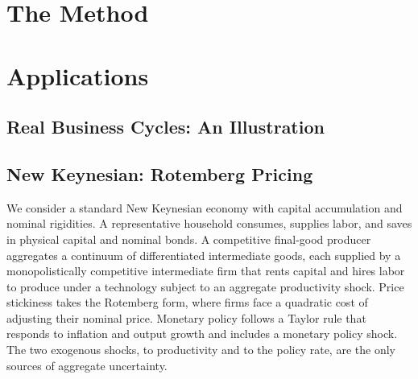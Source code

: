 \documentclass[12pt]{article}
\begin{document}
\section{The Method}\label{sec:method}


\section{Applications}\label{sec:applications}


\subsection{Real Business Cycles: An Illustration}\label{sec:app-rbc}


\subsection{New Keynesian: Rotemberg Pricing}\label{sec:app-rotemberg}

We consider a standard New Keynesian economy with capital accumulation and nominal rigidities. A representative household consumes, supplies labor, and saves in physical capital and nominal bonds. A competitive final-good producer aggregates a continuum of differentiated intermediate goods, each supplied by a monopolistically competitive intermediate firm that rents capital and hires labor to produce under a technology subject to an aggregate productivity shock. Price stickiness takes the Rotemberg form, where firms face a quadratic cost of adjusting their nominal price. Monetary policy follows a Taylor rule that responds to inflation and output growth and includes a monetary policy shock. The two exogenous shocks, to productivity and to the policy rate, are the only sources of aggregate uncertainty.
\end{document}
